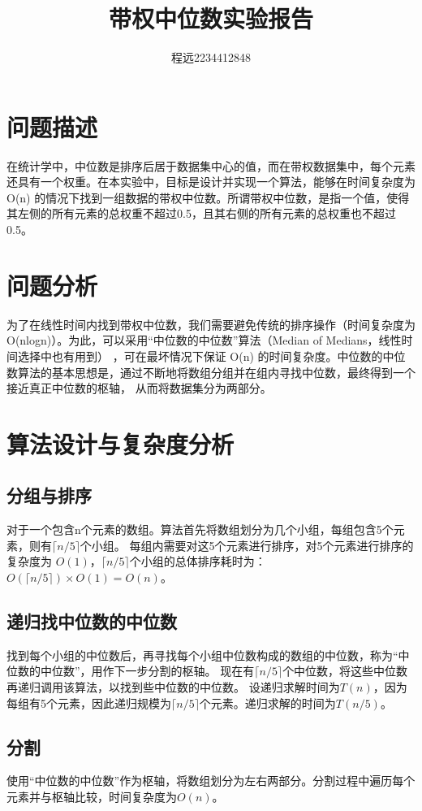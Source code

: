 \documentclass[UTF8]{ctexart}
\begin{document}
\title{\vspace{0cm}带权中位数实验报告}
\author{程远2234412848}
\date{}
\maketitle
\tableofcontents
\newpage

\section{问题描述}
在统计学中，中位数是排序后居于数据集中心的值，而在带权数据集中，每个元素还具有一个权重。在本实验中，目标是设计并实现一个算法，能够在时间复杂度为O(n)
的情况下找到一组数据的带权中位数。所谓带权中位数，是指一个值，使得其左侧的所有元素的总权重不超过0.5，且其右侧的所有元素的总权重也不超过0.5。

\section{问题分析}
为了在线性时间内找到带权中位数，我们需要避免传统的排序操作（时间复杂度为O(nlogn)）。为此，可以采用“中位数的中位数”算法（Median of Medians，线性时间选择中也有用到）
，可在最坏情况下保证 O(n) 的时间复杂度。中位数的中位数算法的基本思想是，通过不断地将数组分组并在组内寻找中位数，最终得到一个接近真正中位数的枢轴，
从而将数据集分为两部分。


\section{算法设计与复杂度分析}
\subsection{分组与排序}
对于一个包含n个元素的数组。算法首先将数组划分为几个小组，每组包含5个元素，则有$⌈n/5⌉$个小组。
每组内需要对这5个元素进行排序，对5个元素进行排序的复杂度为 $O(1)$，$⌈n/5⌉$个小组的总体排序耗时为：$O(⌈n/5⌉)×O(1)=O(n)$。

\subsection{递归找中位数的中位数}
找到每个小组的中位数后，再寻找每个小组中位数构成的数组的中位数，称为“中位数的中位数”，用作下一步分割的枢轴。
现在有$⌈n/5⌉$个中位数，将这些中位数再递归调用该算法，以找到些中位数的中位数。
设递归求解时间为$T(n)$，因为每组有5个元素，因此递归规模为$⌈n/5⌉$个元素。递归求解的时间为$T(n/5)$。

\subsection{分割}
使用“中位数的中位数”作为枢轴，将数组划分为左右两部分。分割过程中遍历每个元素并与枢轴比较，时间复杂度为$O(n)$。
\end{document}
